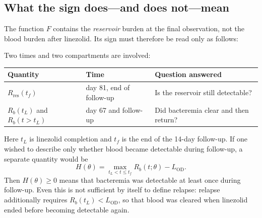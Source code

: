\documentclass[11pt]{article}
\newcommand{\LOD}{L_{\mathrm{OD}}}
\begin{document}
\subsection{What the sign does---and does not---mean}
\label{sec:sign-meaning}

The function $F$ contains the \emph{reservoir} burden at the final observation,
not the blood burden after linezolid. Its sign must therefore be read only as
follows:
\begin{center}
\end{center}

Two times and two compartments are involved:
\begin{center}
\begin{tabular}{@{}lll@{}}
\toprule
Quantity & Time & Question answered \\
\midrule
$R_{\mathrm{res}}(t_f)$ & day 81, end of follow-up & Is the reservoir still detectable? \\
$R_b(t_L)$ and $R_b(t>t_L)$ & day 67 and follow-up & Did bacteremia clear and then return? \\
\bottomrule
\end{tabular}
\end{center}
Here $t_L$ is linezolid completion and $t_f$ is the end of the 14-day
follow-up. If one wished to describe only whether blood became detectable
during follow-up, a separate quantity would be
\begin{equation}
H(\theta)=\max_{t_L<t\leq t_f}R_b(t;\theta)-\LOD.
\label{eq:blood-followup}
\end{equation}
Then $H(\theta)\geq0$ means that bacteremia was detectable at least once
during follow-up. Even this is not sufficient by itself to define relapse:
relapse additionally requires $R_b(t_L)<\LOD$, so that blood was cleared when
linezolid ended before becoming detectable again.
\end{document}
